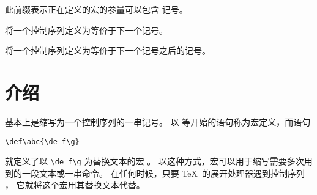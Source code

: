 \documentclass[letterpaper]{book}
\begin{document}
\begin{inventory}
\item [\cs{long}] 
      此前缀表示正在定义的宏的参量可以包含  记号。

\item [\cs{let}] 
      将一个控制序列定义为等价于下一个记号。

\item [\cs{futurelet}] 
      将一个控制序列定义为等价于下一个记号之后的记号。

\end{inventory}

\section{介绍}

基本上是缩写为一个控制序列的一串记号。
以  等开始的语句称为{\italic 宏定义}，而语句
\begin{verbatim}
\def\abc{\de f\g}
\end{verbatim}
就定义了以 \verb>\de f\g> 为{\italic 替换文本\/}的宏 。
以这种方式，宏可以用于缩写需要多次用到的一段文本或一串命令。
在任何时候，只要 \TeX\ 的展开处理器遇到控制序列 ，
它就将这个宏用其替换文本代替。
\end{document}
